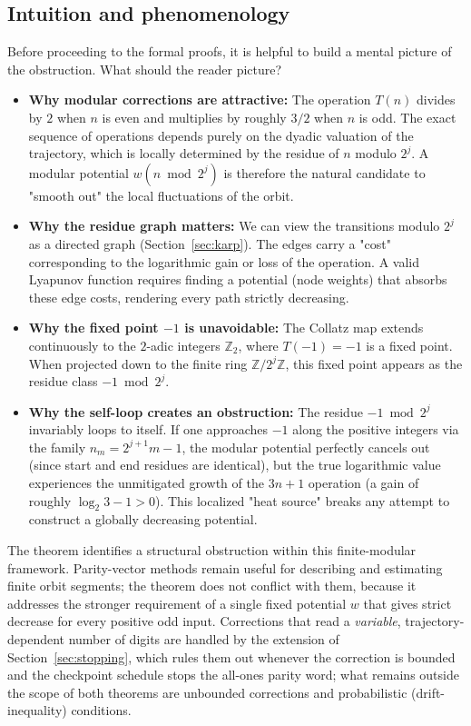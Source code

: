 \documentclass[11pt]{amsart}
\theoremstyle{definition}
\theoremstyle{remark}
\newcommand{\Z}{\mathbb{Z}}
\begin{document}
\begin{enumerate}
\end{enumerate}

\subsection{Intuition and phenomenology}\label{sec:intuition}
Before proceeding to the formal proofs, it is helpful to build a mental picture of the obstruction. What should the reader picture?
\begin{itemize}
\item \textbf{Why modular corrections are attractive:} The operation $T(n)$ divides by $2$ when $n$ is even and multiplies by roughly $3/2$ when $n$ is odd. The exact sequence of operations depends purely on the dyadic valuation of the trajectory, which is locally determined by the residue of $n$ modulo $2^j$. A modular potential $w(n \bmod 2^j)$ is therefore the natural candidate to "smooth out" the local fluctuations of the orbit.
\item \textbf{Why the residue graph matters:} We can view the transitions modulo $2^j$ as a directed graph (Section~\ref{sec:karp}). The edges carry a "cost" corresponding to the logarithmic gain or loss of the operation. A valid Lyapunov function requires finding a potential (node weights) that absorbs these edge costs, rendering every path strictly decreasing.
\item \textbf{Why the fixed point $-1$ is unavoidable:} The Collatz map extends continuously to the $2$-adic integers $\Z_2$, where $T(-1) = -1$ is a fixed point. When projected down to the finite ring $\Z/2^j\Z$, this fixed point appears as the residue class $-1 \bmod 2^j$.
\item \textbf{Why the self-loop creates an obstruction:} The residue $-1 \bmod 2^j$ invariably loops to itself. If one approaches $-1$ along the positive integers via the family $n_m = 2^{j+1}m - 1$, the modular potential perfectly cancels out (since start and end residues are identical), but the true logarithmic value experiences the unmitigated growth of the $3n+1$ operation (a gain of roughly $\log_2 3 - 1 > 0$). This localized "heat source" breaks any attempt to construct a globally decreasing potential.
\end{itemize}

The theorem identifies a structural obstruction within this finite-modular framework. Parity-vector methods remain useful for describing and estimating finite orbit segments; the theorem does not conflict with them, because it addresses the stronger requirement of a single fixed potential $w$ that gives strict decrease for every positive odd input. Corrections that read a \emph{variable}, trajectory-dependent number of digits are handled by the extension of Section~\ref{sec:stopping}, which rules them out whenever the correction is bounded and the checkpoint schedule stops the all-ones parity word; what remains outside the scope of both theorems are unbounded corrections and probabilistic (drift-inequality) conditions.
\end{document}
